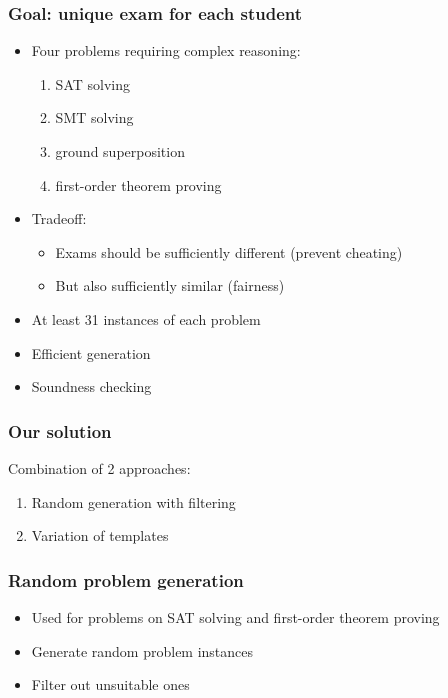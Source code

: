 \documentclass[xcolor={table}]{beamer}
\begin{document}


\begin{frame}
\frametitle{Goal: unique exam for each student}
\begin{itemize}
\item Four problems requiring complex reasoning:
    \begin{enumerate}
        \item SAT solving
        \item SMT solving
        \item ground superposition
        \item first-order theorem proving
    \end{enumerate}
    \pause
\item Tradeoff:
    \begin{itemize}
    \item Exams should be sufficiently different (prevent cheating)
    \item But also sufficiently similar (fairness)
    \end{itemize}
    \pause
\item At least 31 instances of each problem
\item Efficient generation
\item Soundness checking
\end{itemize}
\end{frame}



\begin{frame}
\frametitle{Our solution}
Combination of 2 approaches:
\begin{enumerate}
\item Random generation with filtering
\item Variation of templates
\end{enumerate}
\end{frame}



\begin{frame}
\frametitle{Random problem generation}
\begin{itemize}
\item Used for problems on SAT solving and first-order theorem proving
\item Generate random problem instances
\item Filter out unsuitable ones
\end{itemize}
\end{frame}
\end{document}
